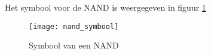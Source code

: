 Het symbool voor de NAND is weergegeven in figuur \ref{symbool:nand}

\begin{figure}[h]
\texttt{[image: nand\_symbool]}
\centering
\caption{Symbool van een NAND}
\label{symbool:nand}
\end{figure}

